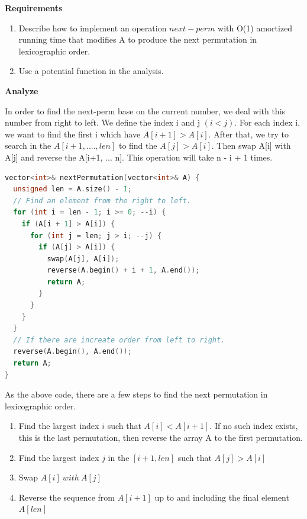 \begin{homeworkProblem}

\textbf{Requirements}
    \begin{enumerate}
        \item Describe how to implement an operation $next-perm$ with O(1) amortized running time that modifies A to produce the next permutation in lexicographic order.
        \item Use a potential function in the analysis.
    \end{enumerate}

\textbf{Analyze}

In order to find the next-perm base on the current number, we deal with this number from right to left. We define the index i and j $(i < j)$. For each index i, we want to find the first i which have $A[i+1] > A[i]$. After that, we try to search in the $A[i+1, ...., len]$ to find the $A[j] > A[i]$. Then swap A[i] with A[j] and reverse the A[i+1, ... n]. This operation will take n - i + 1 times. 

\begin{lstlisting}[language=C++]
vector<int>& nextPermutation(vector<int>& A) {
  unsigned len = A.size() - 1;
  // Find an element from the right to left.
  for (int i = len - 1; i >= 0; --i) {
    if (A[i + 1] > A[i]) {
      for (int j = len; j > i; --j) {
        if (A[j] > A[i]) {
          swap(A[j], A[i]);
          reverse(A.begin() + i + 1, A.end());
          return A;
        }
      }
    }
  }
  // If there are increate order from left to right.
  reverse(A.begin(), A.end());
  return A;
}
\end{lstlisting}

As the above code, there are a few steps to find the next permutation in lexicographic order. 
\begin{enumerate}
    \item Find the largest index $i$ such that $A[i] < A[i+1]$. If no such index exists, this is the last permutation, then reverse the array A to the first permutation.
    \item Find the largest index $j$ in the $[i+1, len]$ such that $A[j] > A[i]$
    \item Swap $A[i] \  with \  A[j]$
    \item Reverse the sequence from $A[i+1]$ up to and including the final element $A[len]$
\end{enumerate}


\end{homeworkProblem}
